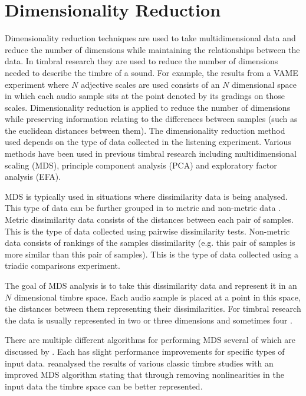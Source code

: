 	\section{Dimensionality Reduction}
	\label{sec:Timbre-Parameterisation-DimensionalityReduction}
		Dimensionality reduction techniques are used to take multidimensional data and reduce the number of
		dimensions while maintaining the relationships between the data. In timbral research they are used to reduce
		the number of dimensions needed to describe the timbre of a sound. For example, the results from a VAME
		experiment where $N$ adjective scales are used consists of an $N$ dimensional space in which each audio
		sample sits at the point denoted by its gradings on those scales. Dimensionality reduction is applied to
		reduce the number of dimensions while preserving information relating to the differences between samples
		(such as the euclidean distances between them). The dimensionality reduction method used depends on the type
		of data collected in the listening experiment.  Various methods have been used in previous timbral research
		including multidimensional scaling (MDS), principle component analysis (PCA) and exploratory factor analysis
		(EFA).

		MDS is typically used in situations where dissimilarity data is being analysed. This type of data can be
		further grouped in to metric and non-metric data \citep{hair2013multivariate}. Metric dissimilarity data
		consists of the distances between each pair of samples. This is the type of data collected using pairwise
		dissimilarity tests. Non-metric data consists of rankings of the samples dissimilarity (e.g. this pair of
		samples is more similar than this pair of samples). This is the type of data collected using a triadic
		comparisons experiment.

		The goal of MDS analysis is to take this dissimilarity data and represent it in an $N$ dimensional timbre
		space.  Each audio sample is placed at a point in this space, the distances between them representing their
		dissimilarities. For timbral research the data is usually represented in two \citep{giragama2003relating}
		or three \citep{grey1978perceptual} dimensions and sometimes four \citep{bernays2011verbal}.
		
		There are multiple different algorithms for performing MDS several of which are discussed by
		\citet{mcadams1999perspectives}. Each has slight performance improvements for specific types of input data.
		\citet{burgoyne2008a} reanalysed the results of various classic timbre studies with an improved MDS
		algorithm stating that through removing nonlinearities in the input data the timbre space can be better
		represented.


